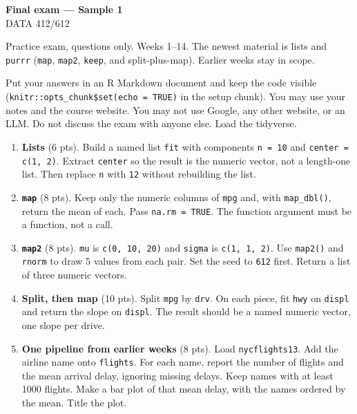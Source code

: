 \documentclass[11pt]{article}
\begin{document}
\begin{center}
{\LARGE\bfseries Final exam --- Sample 1}\\[0.35em]
DATA 412/612
\end{center}

\vspace{0.2em}

Practice exam, questions only. Weeks 1--14. The newest material
is lists and \texttt{purrr} (\texttt{map}, \texttt{map2},
\texttt{keep}, and split-plus-map). Earlier weeks stay in scope.

Put your answers in an R Markdown document and keep the code visible
(\texttt{knitr::opts\_chunk\$set(echo = TRUE)} in the setup chunk).
You may use your notes and the course website.
You may not use Google, any other website, or an LLM.
Do not discuss the exam with anyone else.
Load the tidyverse.

\begin{enumerate}
\item \textbf{Lists} (6 pts).
Build a named list \texttt{fit} with components \texttt{n = 10} and
\texttt{center = c(1, 2)}.
Extract \texttt{center} so the result is the numeric vector, not a
length-one list.
Then replace \texttt{n} with \texttt{12} without rebuilding the list.

\item \textbf{\texttt{map}} (8 pts).
Keep only the numeric columns of \texttt{mpg} and, with
\texttt{map\_dbl()}, return the mean of each.
Pass \texttt{na.rm = TRUE}.
The function argument must be a function, not a call.

\item \textbf{\texttt{map2}} (8 pts).
\texttt{mu} is \texttt{c(0, 10, 20)} and \texttt{sigma} is
\texttt{c(1, 1, 2)}.
Use \texttt{map2()} and \texttt{rnorm} to draw 5 values from each
pair. Set the seed to \texttt{612} first.
Return a list of three numeric vectors.

\item \textbf{Split, then map} (10 pts).
Split \texttt{mpg} by \texttt{drv}.
On each piece, fit \texttt{hwy} on \texttt{displ} and return the
slope on \texttt{displ}.
The result should be a named numeric vector, one slope per drive.

\item \textbf{One pipeline from earlier weeks} (8 pts).
Load \texttt{nycflights13}.
Add the airline name onto \texttt{flights}.
For each name, report the number of flights and the mean arrival
delay, ignoring missing delays.
Keep names with at least 1000 flights.
Make a bar plot of that mean delay, with the names ordered by the
mean. Title the plot.
\end{enumerate}
\end{document}
